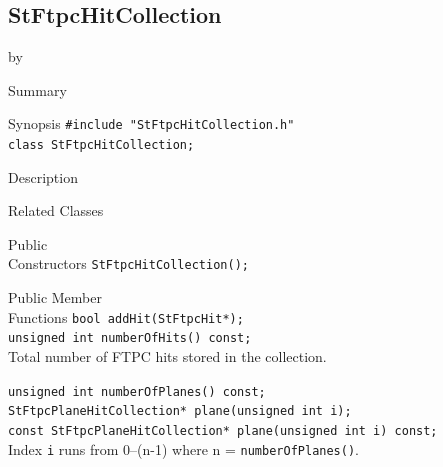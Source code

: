 \documentclass[twoside]{article}
\newcommand{\entrylabel}[1]{\mbox{\textbf{{#1}}}\hfil}%
\newenvironment{entry}
{\begin{list}{}%
    {\renewcommand{\makelabel}{\entrylabel}%
     \setlength{\labelwidth}{90pt}%
     \setlength{\leftmargin}{\labelwidth}
     \advance\leftmargin by \labelsep%
      }%
    }%
  {\end{list}}
\newcommand{\Entrylabel}[1]%
{\raisebox{0pt}[1ex][0pt]{\makebox[\labelwidth][l]%
    {\parbox[t]{\labelwidth}{\hspace{0pt}\textbf{{#1}}}}}}
\newenvironment{Entry}%
{\renewcommand{\entrylabel}{\Entrylabel}\begin{entry}}%
  {\end{entry}}
\begin{document}
\subsection{StFtpcHitCollection}
\label{sec:StFtpcHitCollection}
\begin{Entry}
\item[Summary]
\item[Synopsis]
    \verb+#include "StFtpcHitCollection.h"+\\
    \verb+class StFtpcHitCollection;+\\
\item[Description]
\item[Related Classes]
\item[Public\\ Constructors]
    \verb+StFtpcHitCollection();+\\
\item[Public Member\\ Functions]
    \verb+bool addHit(StFtpcHit*);+\\
    
    \verb+unsigned int numberOfHits() const;+\\
    Total number of FTPC hits stored in the collection.
    
    \verb+unsigned int numberOfPlanes() const;+\\
    
    \verb+StFtpcPlaneHitCollection* plane(unsigned int i);+\\
    \verb+const StFtpcPlaneHitCollection* plane(unsigned int i) const;+\\
    Index \texttt{i} runs from 0--(n-1) where n =
    \texttt{numberOfPlanes()}.
\end{Entry}
\clearpage
\end{document}
